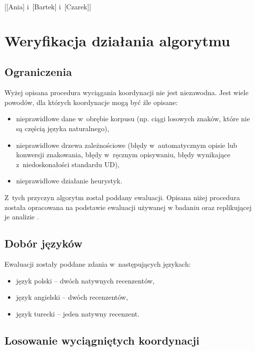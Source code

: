 \begin{exe}
\ex \label{A+B+C-koordynacja}
{[[Ania] i~[Bartek] i~[Czarek]]}
\end{exe}

\section{Weryfikacja działania algorytmu}

\subsection{Ograniczenia}

Wyżej opisana procedura wyciągania koordynacji nie jest niezawodna. Jest wiele powodów, dla których koordynacje mogą być źle opisane:

\begin{itemize}
\item nieprawidłowe dane w~obrębie korpusu (np. ciągi losowych znaków, które nie są częścią języka naturalnego),
\item nieprawidłowe drzewa zależnościowe (błędy w~automatycznym opisie lub konwersji znakowania, błędy w~ręcznym opisywaniu, błędy wynikające z~niedoskonałości standardu UD),
\item nieprawidłowe działanie heurystyk.
\end{itemize}

Z~tych przyczyn algorytm został poddany ewaluacji. Opisana niżej procedura została opracowana na podstawie ewaluacji używanej w badaniu \cite{przepiorkowski2023conjunct} oraz replikującej je analizie \cite{przepiorkowski2024argument}.

\subsection{Dobór języków}

Ewaluacji zostały poddane zdania w~następujących językach:

\begin{itemize}
\item język polski -- dwóch natywnych recenzentów,
\item język angielski -- dwóch recenzentów,
\item język turecki -- jeden natywny recenzent.
\end{itemize}

\subsection{Losowanie wyciągniętych koordynacji}

